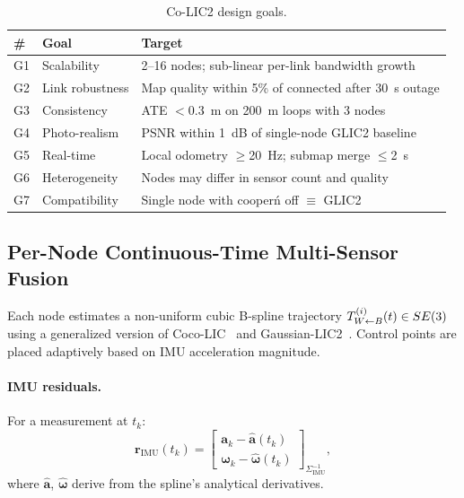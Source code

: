 \begin{table}[t]
  \centering
  \caption{Co-LIC2 design goals.}
  \label{tab:goals_list}
  \footnotesize
  \setlength{\tabcolsep}{3pt}
  \begin{tabular}{@{}p{0.4cm}p{1.6cm}p{5.0cm}@{}}
    \toprule
    \# & Goal & Target \\
    \midrule
    G1 & Scalability     & 2--16 nodes; sub-linear per-link bandwidth growth \\
    G2 & Link robustness & Map quality within 5\% of connected after 30~s outage \\
    G3 & Consistency     & ATE $<$0.3~m on 200~m loops with 3 nodes \\
    G4 & Photo-realism   & PSNR within 1~dB of single-node GLIC2 baseline \\
    G5 & Real-time       & Local odometry $\ge$20~Hz; submap merge $\le$2~s \\
    G6 & Heterogeneity   & Nodes may differ in sensor count and quality \\
    G7 & Compatibility   & Single node with cooper\'n off $\equiv$ GLIC2 \\
    \bottomrule
  \end{tabular}
\end{table}

\subsection{Per-Node Continuous-Time Multi-Sensor Fusion}

\label{sec:ctfusion}

Each node estimates a non-uniform cubic B-spline trajectory
$T_{W\leftarrow B}^{(i)}(t)\in SE(3)$ using a generalized version of
Coco-LIC~\cite{lang2023coco} and Gaussian-LIC2~\cite{lang2026gaussian2}.
Control points are placed adaptively based on IMU acceleration magnitude.

\paragraph{IMU residuals.} For a measurement at $t_k$:
\begin{equation}
  \mathbf{r}_{\text{IMU}}(t_k) =
  \begin{bmatrix} \mathbf{a}_k-\hat{\mathbf{a}}(t_k) \\
  \boldsymbol{\omega}_k-\hat{\boldsymbol{\omega}}(t_k) \end{bmatrix}_{\Sigma_{\text{IMU}}^{-1}},
\end{equation}
where $\hat{\mathbf{a}}$, $\hat{\boldsymbol{\omega}}$ derive from the spline's
analytical derivatives.

